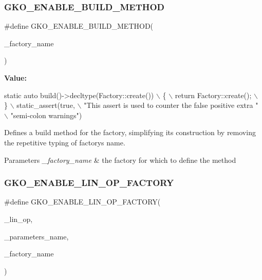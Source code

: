 \subsubsection{\texorpdfstring{G\+K\+O\+\_\+\+E\+N\+A\+B\+L\+E\+\_\+\+B\+U\+I\+L\+D\+\_\+\+M\+E\+T\+H\+OD}{GKO\_ENABLE\_BUILD\_METHOD}}
{\footnotesize\ttfamily \#define G\+K\+O\+\_\+\+E\+N\+A\+B\+L\+E\+\_\+\+B\+U\+I\+L\+D\+\_\+\+M\+E\+T\+H\+OD(\begin{DoxyParamCaption}\item[{}]{\+\_\+factory\+\_\+name }\end{DoxyParamCaption})}

{\bfseries Value\+:}
\begin{DoxyCode}
\textcolor{keyword}{static} \textcolor{keyword}{auto} build()->decltype(Factory::create())                         \(\backslash\)
    \{                                                                        \(\backslash\)
        return Factory::create();                                            \(\backslash\)
    \}                                                                        \(\backslash\)
    static\_assert(\textcolor{keyword}{true},                                                      \(\backslash\)
                  \textcolor{stringliteral}{"This assert is used to counter the false positive extra "} \(\backslash\)
                  \textcolor{stringliteral}{"semi-colon warnings"})
\end{DoxyCode}


Defines a build method for the factory, simplifying its construction by removing the repetitive typing of factory\textquotesingle{}s name. 


\begin{DoxyParams}{Parameters}
{\em \+\_\+factory\+\_\+name} & the factory for which to define the method \\
\hline
\end{DoxyParams}
\mbox{\label{group__LinOp_ga8e0af90ec2414b768266f77cedffc309}} 
\subsubsection{\texorpdfstring{G\+K\+O\+\_\+\+E\+N\+A\+B\+L\+E\+\_\+\+L\+I\+N\+\_\+\+O\+P\+\_\+\+F\+A\+C\+T\+O\+RY}{GKO\_ENABLE\_LIN\_OP\_FACTORY}}
{\footnotesize\ttfamily \#define G\+K\+O\+\_\+\+E\+N\+A\+B\+L\+E\+\_\+\+L\+I\+N\+\_\+\+O\+P\+\_\+\+F\+A\+C\+T\+O\+RY(\begin{DoxyParamCaption}\item[{}]{\+\_\+lin\+\_\+op,  }\item[{}]{\+\_\+parameters\+\_\+name,  }\item[{}]{\+\_\+factory\+\_\+name }\end{DoxyParamCaption})}

